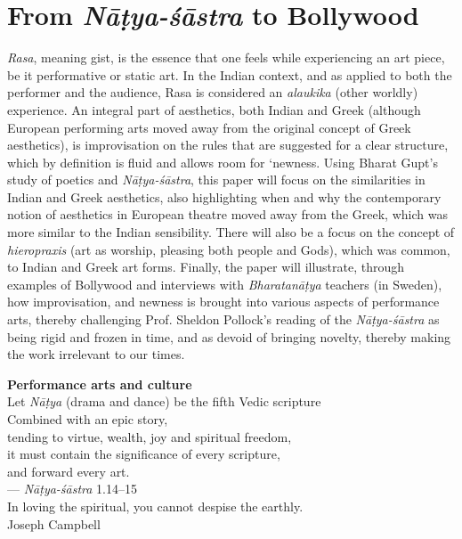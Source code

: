 \chapter[From \textsl{Nāṭya-śāstra} to Bollywood]{From \textsl{Nāṭya-śāstra} to Bollywood}\label{chapter\thechapter:begin}

\textsl{Rasa}, meaning gist, is the essence that one feels while experiencing an art piece, be it performative or static art. In the Indian context, and as applied to both the performer and the audience, Rasa is considered an \textsl{alaukika} (other worldly) experience. An integral part of aesthetics, both Indian and Greek (although European performing arts moved away from the original concept of Greek aesthetics), is improvisation on the rules that are suggested for a clear structure, which by definition is fluid and allows room for ‘newness. Using Bharat Gupt’s study of poetics and \textsl{Nāṭya-śāstra}, this paper will focus on the similarities in Indian and Greek aesthetics, also highlighting when and why the contemporary notion of aesthetics in European theatre moved away from the Greek, which was more similar to the Indian sensibility. There will also be a focus on the concept of \textsl{hieropraxis} (art as worship, pleasing both people and Gods), which was common, to Indian and Greek art forms. Finally, the paper will illustrate, through examples of Bollywood and interviews with \textsl{Bharatanāṭya} teachers (in Sweden), how improvisation, and newness is brought into various aspects of performance arts, thereby challenging Prof. Sheldon Pollock’s reading of the \textsl{Nāṭya-śāstra} as being rigid and frozen in time, and as devoid of bringing novelty, thereby making the work irrelevant to our times. 

\newpage

\begin{flushright}
{\bf Performance arts and culture}\\[2pt]
Let \textsl{Nāṭya} (drama and dance) be the fifth Vedic scripture\\[2pt]
Combined with an epic story,\\[2pt]
tending to virtue, wealth, joy and spiritual freedom,\\[2pt]
it must contain the significance of every scripture,\\[2pt]
and forward every art.\\[2pt]
--- \textsl{Nāṭya-śāstra} 1.14--15\\[2pt]
In loving the spiritual, you cannot despise the earthly.\\[2pt]
Joseph Campbell
\end{flushright}


